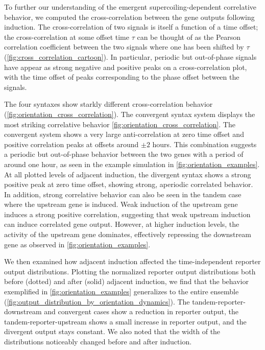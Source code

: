\documentclass[11pt]{article}
\begin{document}
To further our understanding of the emergent supercoiling-dependent correlative behavior, we computed the cross-correlation between the gene outputs following induction. The cross-correlation of two signals is itself a function of a time offset; the cross-correlation at some offset time \(\tau\) can be thought of as the Pearson correlation coefficient between the two signals where one has been shifted by \(\tau\) (\cref{fig:cross_correlation_cartoon}). In particular, periodic but out-of-phase signals have appear as strong negative and positive peaks on a cross-correlation plot, with the time offset of peaks corresponding to the phase offset between the signals.

The four syntaxes show starkly different cross-correlation behavior (\cref{fig:orientation_cross_correlation}). The convergent syntax system displays the most striking correlative behavior \cref{fig:orientation_cross_correlation}. The convergent system shows a very large anti-correlation at zero time offset and positive correlation peaks at offsets around \(\pm 2\) hours. This combination suggests a periodic but out-of-phase behavior between the two genes with a period of around one hour, as seen in the example simulation in \cref{fig:orientation_examples}. At all plotted levels of adjacent induction, the divergent syntax shows a strong positive peak at zero time offset, showing strong, aperiodic correlated behavior.
In addition, strong correlative behavior can also be seen in the tandem case where the upstream gene is induced. Weak induction of the upstream gene induces a strong positive correlation, suggesting that weak upstream induction can induce correlated gene output. However, at higher induction levels, the activity of the upstream gene dominates, effectively repressing the downstream gene as observed in \cref{fig:orientation_examples}.

We then examined how adjacent induction affected the time-independent reporter output distributions. Plotting the normalized reporter output distributions both before (dotted) and after (solid) adjacent induction, we find that the behavior exemplified in \cref{fig:orientation_examples} generalizes to the entire ensemble (\cref{fig:output_distribution_by_orientation_dynamics}). The tandem-reporter-downstream and convergent cases show a reduction in reporter output, the tandem-reporter-upstream shows a small increase in reporter output, and the divergent output stays constant. We also noted that the width of the distributions noticeably changed before and after induction.
\end{document}
